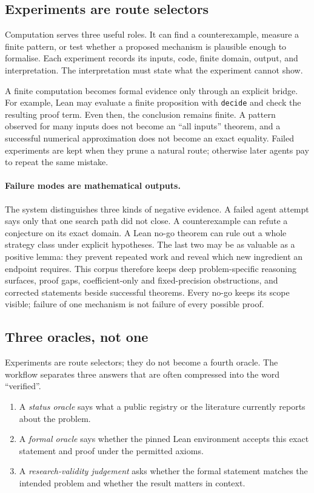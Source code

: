 \documentclass[10pt]{article}
\begin{document}
\subsection{Experiments are route selectors}

Computation serves three useful roles. It can find a counterexample, measure a
finite pattern, or test whether a proposed mechanism is plausible enough to
formalise. Each experiment records its inputs, code, finite domain, output, and
interpretation. The interpretation must state what the experiment cannot show.

A finite computation becomes formal evidence only through an explicit bridge.
For example, Lean may evaluate a finite proposition with \texttt{decide} and
check the resulting proof term. Even then, the conclusion remains finite. A
pattern observed for many inputs does not become an ``all inputs'' theorem, and
a successful numerical approximation does not become an exact equality. Failed
experiments are kept when they prune a natural route; otherwise later agents
pay to repeat the same mistake.

\paragraph{Failure modes are mathematical outputs.}
The system distinguishes three kinds of negative evidence. A failed agent
attempt says only that one search path did not close. A counterexample can
refute a conjecture on its exact domain. A Lean no-go theorem can rule out a
whole strategy class under explicit hypotheses. The last two may be as
valuable as a positive lemma: they prevent repeated work and reveal which new
ingredient an endpoint requires. This corpus therefore keeps deep
problem-specific reasoning surfaces, proof gaps, coefficient-only and
fixed-precision obstructions, and corrected statements beside successful
theorems. Every no-go keeps its scope visible; failure of one mechanism is not
failure of every possible proof.

\subsection{Three oracles, not one}

Experiments are route selectors; they do not become a fourth oracle.
The workflow separates three answers that are often compressed into the word
``verified''.

\begin{enumerate}
\item A \emph{status oracle} says what a public registry or the literature
      currently reports about the problem.
\item A \emph{formal oracle} says whether the pinned Lean environment accepts
      this exact statement and proof under the permitted axioms.
\item A \emph{research-validity judgement} asks whether the formal statement
      matches the intended problem and whether the result matters in context.
\end{enumerate}
\end{document}

